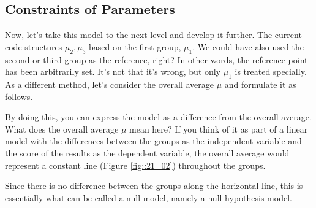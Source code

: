 \documentclass{ltjsbook}
\begin{document}
\subsection{Constraints of Parameters}
Now, let's take this model to the next level and develop it further.
The current code structures $\mu_2,\mu_3$ based on the first group, $\mu_1$. We could have also used the second or third group as the reference, right? In other words, the reference point has been arbitrarily set.
It's not that it's wrong, but only $\mu_1$ is treated specially. As a different method, let's consider the overall average $\mu$ and formulate it as follows.


By doing this, you can express the model as a difference from the overall average.
What does the overall average $\mu$ mean here? If you think of it as part of a linear model with the differences between the groups as the independent variable and the score of the results as the dependent variable, the overall average would represent a constant line (Figure \ref{fig::21_02}) throughout the groups.

Since there is no difference between the groups along the horizontal line, this is essentially what can be called a null model, namely a null hypothesis model.
\end{document}
